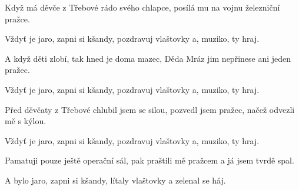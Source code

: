 \beginverse{}
Když má děvče z Třebové rádo svého chlapce,
posílá mu na vojnu železniční pražce.
\endverse{}

\repeatingchorus{}
\beginchorus{}
Vždyť je jaro, zapni si kšandy,
pozdravuj vlaštovky a, muziko, ty hraj.
\endchorus{}

\beginverse{}
A když děti zlobí, tak hned je doma mazec,
Děda Mráz jim nepřinese ani jeden pražec.
\endverse{}

\repeatingchorus{}
\beginchorus{}
Vždyť je jaro, zapni si kšandy,
pozdravuj vlaštovky a, muziko, ty hraj.
\endchorus{}

\beginverse{}
Před děvčaty z Třebové chlubil jsem se silou,
pozvedl jsem pražec, načež odvezli mě s kýlou.
\endverse{}

\repeatingchorus{}
\beginchorus{}
Vždyť je jaro, zapni si kšandy,
pozdravuj vlaštovky a, muziko, ty hraj.
\endchorus{}

\beginverse{}
Pamatuji pouze ještě operační sál,
pak praštili mě pražcem a já jsem tvrdě spal.
\endverse{}

\beginchorus{}
A bylo jaro, zapni si kšandy,
lítaly vlaštovky a zelenal se háj.
\endchorus{}

\endsong{}
